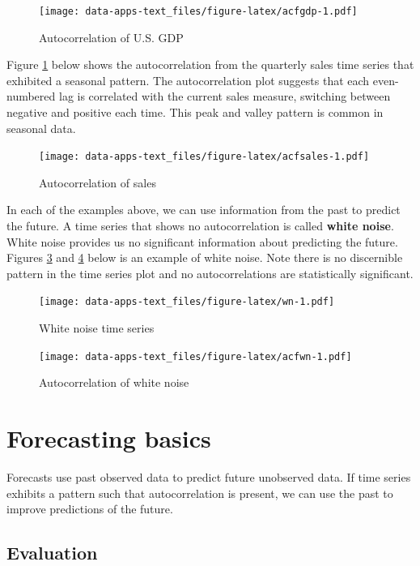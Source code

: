 \documentclass[
]{book}
\begin{document}
\begin{figure}
\centering
\texttt{[image: data-apps-text\_files/figure-latex/acfgdp-1.pdf]}
\caption{\label{fig:acfgdp}Autocorrelation of U.S. GDP}
\end{figure}

Figure \ref{fig:acfgdp} below shows the autocorrelation from the quarterly sales time series that exhibited a seasonal pattern. The autocorrelation plot suggests that each even-numbered lag is correlated with the current sales measure, switching between negative and positive each time. This peak and valley pattern is common in seasonal data.

\begin{figure}
\centering
\texttt{[image: data-apps-text\_files/figure-latex/acfsales-1.pdf]}
\caption{\label{fig:acfsales}Autocorrelation of sales}
\end{figure}

In each of the examples above, we can use information from the past to predict the future. A time series that shows no autocorrelation is called \textbf{white noise}. White noise provides us no significant information about predicting the future. Figures \ref{fig:wn} and \ref{fig:acfwn} below is an example of white noise. Note there is no discernible pattern in the time series plot and no autocorrelations are statistically significant.

\begin{figure}
\centering
\texttt{[image: data-apps-text\_files/figure-latex/wn-1.pdf]}
\caption{\label{fig:wn}White noise time series}
\end{figure}

\begin{figure}
\centering
\texttt{[image: data-apps-text\_files/figure-latex/acfwn-1.pdf]}
\caption{\label{fig:acfwn}Autocorrelation of white noise}
\end{figure}

\hypertarget{forecasting-basics}{%
\section{Forecasting basics}\label{forecasting-basics}}

Forecasts use past observed data to predict future unobserved data. If time series exhibits a pattern such that autocorrelation is present, we can use the past to improve predictions of the future.

\hypertarget{evaluation}{%
\subsection{Evaluation}\label{evaluation}}
\end{document}
